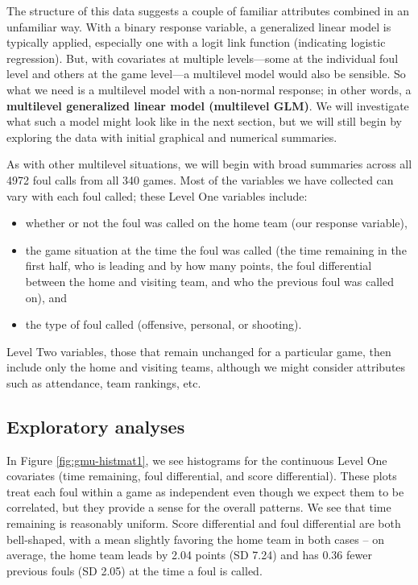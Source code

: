 \documentclass[
]{krantz}
\providecommand{\tightlist}{%
  \setlength{\itemsep}{0pt}\setlength{\parskip}{0pt}}
\begin{document}
The structure of this data suggests a couple of familiar attributes combined in an unfamiliar way. With a binary response variable, a generalized linear model is typically applied, especially one with a logit link function (indicating logistic regression). But, with covariates at multiple levels---some at the individual foul level and others at the game level---a multilevel model would also be sensible. So what we need is a multilevel model with a non-normal response; in other words, a \textbf{multilevel generalized linear model (multilevel GLM)}.  We will investigate what such a model might look like in the next section, but we will still begin by exploring the data with initial graphical and numerical summaries.

As with other multilevel situations, we will begin with broad summaries across all 4972 foul calls from all 340 games. Most of the variables we have collected can vary with each foul called; these Level One variables include:

\begin{itemize}
\tightlist
\item
  whether or not the foul was called on the home team (our response variable),
\item
  the game situation at the time the foul was called (the time remaining in the first half, who is leading and by how many points, the foul differential between the home and visiting team, and who the previous foul was called on), and
\item
  the type of foul called (offensive, personal, or shooting).
\end{itemize}

Level Two variables, those that remain unchanged for a particular game, then include only the home and visiting teams, although we might consider attributes such as attendance, team rankings, etc.

\hypertarget{glmm-eda}{%
\subsection{Exploratory analyses}\label{glmm-eda}}

In Figure \ref{fig:gmu-histmat1}, we see histograms for the continuous Level One covariates (time remaining, foul differential, and score differential). These plots treat each foul within a game as independent even though we expect them to be correlated, but they provide a sense for the overall patterns. We see that time remaining is reasonably uniform. Score differential and foul differential are both bell-shaped, with a mean slightly favoring the home team in both cases -- on average, the home team leads by 2.04 points (SD 7.24) and has 0.36 fewer previous fouls (SD 2.05) at the time a foul is called.
\end{document}
